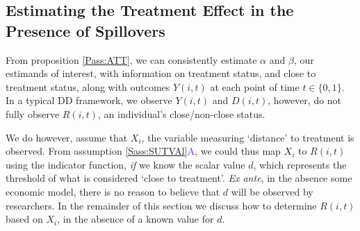 \documentclass{article}
\newcommand{\asref}[2]{\ref{#1}{\textcolor{BlueViolet}{#2}}}
\begin{document}
\begin{spacing}{1.1}
\subsection{Estimating the Treatment Effect in the Presence of Spillovers}
From proposition \ref{Pass:ATT}, we can consistently estimate $\alpha$
and $\beta$, our estimands of interest, with information on treatment
status, and close to treatment status, along with outcomes $Y(i,t)$ at
each point of time $t\in\{0,1\}$.  In a typical DD framework, we
observe $Y(i,t)$ and $D(i,t)$, however, do not fully observe $R(i,t)$,
an individual's close/non-close status.

We do however, assume that $X_i$, the variable measuring `distance' to
treatment is observed.  From assumption \asref{Sass:SUTVAl}{A}, we could
thus map $X_i$ to $R(i,t)$ using the indicator function, \emph{if} we
know the scalar value $d$, which represents the threshold of what is
considered `close to treatment'.  \emph{Ex ante}, in the absence some
economic model, there is no reason to believe that $d$ will be
observed by researchers.  In the remainder of this section we discuss
how to determine $R(i,t)$ based on $X_i$, in the absence of a known
value for $d$.


\end{spacing}
\end{document}
